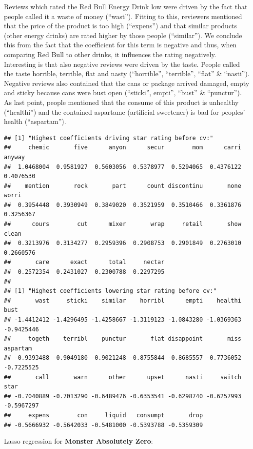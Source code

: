 \documentclass[
]{article}
\begin{document}
Reviews which rated the Red Bull Energy Drink low were driven by the
fact that people called it a waste of money (``wast''). Fitting to this,
reviewers mentioned that the price of the product is too high
(``expens'') and that similar products (other energy drinks) are rated
higher by those people (``similar''). We conclude this from the fact
that the coefficient for this term is negative and thus, when comparing
Red Bull to other drinks, it influences the rating negatively.
Interesting is that also negative reviews were driven by the taste.
People called the taste horrible, terrible, flat and nasty
(``horrible'', ``terrible'', ``flat'' \& ``nasti''). Negative reviews
also contained that the cans or package arrived damaged, empty and
sticky because cans were bust open (``sticki'', empti'', ``bust'' \&
``punctur''). As last point, people mentioned that the consume of this
product is unhealthy (``healthi'') and the contained aspartame
(artificial sweetener) is bad for peoples' health (``aspartam''). \small

\begin{verbatim}
## [1] "Highest coefficients driving star rating before cv:"
##     chemic       five      anyon      secur        mom      carri     anyway 
##  1.0468004  0.9581927  0.5603056  0.5378977  0.5294065  0.4376122  0.4076530 
##    mention       rock       part      count discontinu       none      worri 
##  0.3954448  0.3930949  0.3849020  0.3521959  0.3510466  0.3361876  0.3256367 
##      cours        cut      mixer       wrap     retail       show      clean 
##  0.3213976  0.3134277  0.2959396  0.2908753  0.2901849  0.2763010  0.2660576 
##       care      exact      total     nectar 
##  0.2572354  0.2431027  0.2300788  0.2297295 
## 
## [1] "Highest coefficients lowering star rating before cv:"
##       wast     sticki    similar    horribl      empti    healthi       bust 
## -1.4412412 -1.4296495 -1.4258667 -1.3119123 -1.0843280 -1.0369363 -0.9425446 
##     togeth    terribl    punctur       flat disappoint       miss   aspartam 
## -0.9393488 -0.9049180 -0.9021248 -0.8755844 -0.8685557 -0.7736052 -0.7225525 
##       call       warn      other      upset      nasti     switch       star 
## -0.7040889 -0.7013290 -0.6489476 -0.6353541 -0.6298740 -0.6257993 -0.5967297 
##     expens        con     liquid   consumpt       drop 
## -0.5666932 -0.5642033 -0.5481000 -0.5393788 -0.5359309
\end{verbatim}

\normalsize

Lasso regression for \textbf{Monster Absolutely Zero}:
\end{document}
